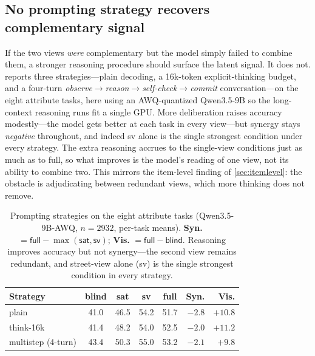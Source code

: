 \documentclass[runningheads]{llncs}
\begin{document}
\subsection{No prompting strategy recovers complementary signal}
\label{sec:strategies}

If the two views \emph{were} complementary but the model simply failed to
combine them, a stronger reasoning procedure should surface the latent signal. It
does not.  reports three strategies---plain decoding, a
\num{16}k-token explicit-thinking budget, and a four-turn
\emph{observe$\rightarrow$reason$\rightarrow$self-check$\rightarrow$commit}
conversation---on the eight attribute tasks, here using an AWQ-quantized
Qwen3.5-9B so the long-context reasoning runs fit a single GPU. More deliberation
raises accuracy modestly---the model gets better at each task in every
view---but synergy stays \emph{negative} throughout, and indeed \textsf{sv} alone
is the single strongest condition under every strategy. The extra reasoning
accrues to the single-view conditions just as much as to \textsf{full}, so what
improves is the model's reading of one view, not its ability to combine two. This
mirrors the item-level finding of \cref{sec:itemlevel}: the obstacle is
adjudicating between redundant views, which more thinking does not remove.

\begin{table}[t]
  \centering
  \caption{Prompting strategies on the eight attribute tasks (Qwen3.5-9B-AWQ,
  $n=\num{2932}$, per-task means). \textbf{Syn.} $=\textsf{full}-\max(\textsf{sat},
  \textsf{sv})$; \textbf{Vis.} $=\textsf{full}-\textsf{blind}$. Reasoning improves
  accuracy but not synergy---the second view remains redundant, and street-view
  alone (\textsf{sv}) is the single strongest condition in every strategy.}
  \label{tab:strategies}
  \setlength{\tabcolsep}{6pt}
  \begin{tabular}{@{}lccccrr@{}}
    \toprule
    Strategy & blind & sat & sv & full & Syn. & Vis. \\
    \midrule
    plain                 & 41.0 & 46.5 & 54.2 & 51.7 & $-2.8$ & $+10.8$ \\
    think-16k             & 41.4 & 48.2 & 54.0 & 52.5 & $-2.0$ & $+11.2$ \\
    multistep (4-turn)    & 43.4 & 50.3 & 55.0 & 53.2 & $-2.1$ & $+9.8$ \\
    \bottomrule
  \end{tabular}
\end{table}
\end{document}
